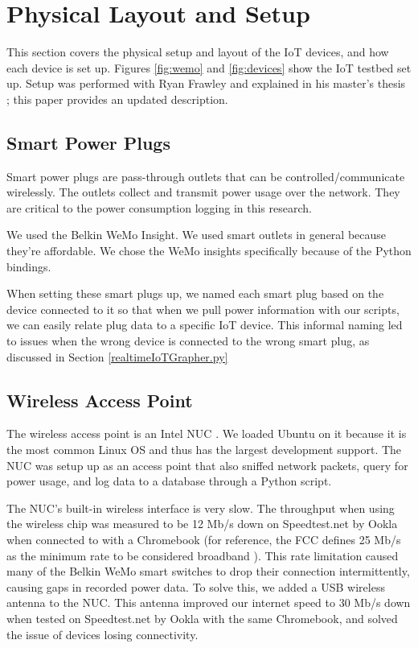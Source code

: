 \section{Physical Layout and Setup}
\label{Physical Layout and Setup}

This section covers the physical setup and layout of the IoT devices, and how each device is set up. Figures \ref{fig:wemo} and \ref{fig:devices} show the IoT testbed set up. Setup was performed with Ryan Frawley and explained in his master's thesis \cite{frawley_2018}; this paper provides an updated description.

\subsection{Smart Power Plugs}
Smart power plugs are pass-through outlets that can be controlled/communicate wirelessly. The outlets collect and transmit power usage over the network. They are critical to the power consumption logging in this research.

We used the Belkin WeMo Insight. We used smart outlets in general because they're affordable. We chose the WeMo insights specifically because of the Python bindings.

When setting these smart plugs up, we named each smart plug based on the device connected to it so that when we pull power information with our scripts, we can easily relate plug data to a specific IoT device. This informal naming led to issues when the wrong device is connected to the wrong smart plug, as discussed in Section \ref{realtimeIoTGrapher.py}

\subsection{Wireless Access Point}
\label{Wireless Access Point}
The wireless access point is an Intel NUC \cite{nuc}. We loaded Ubuntu\cite{ubuntu} on it because it is the most common Linux OS \cite{linux} and thus has the largest development support. The NUC was setup up as an access point that also sniffed network packets, query for power usage, and log data to a database through a Python script.

The NUC's built-in wireless interface is very slow. The throughput when using the wireless chip was measured to be 12 Mb/s down on Speedtest.net by Ookla \cite{speedtest} when connected to with a Chromebook \cite{chromebook} (for reference, the FCC defines 25 Mb/s as the minimum rate to be considered broadband \cite{fcc_2018}). This rate limitation caused many of the Belkin WeMo smart switches \cite{wemo} to drop their connection intermittently, causing gaps in recorded power data. To solve this, we added a USB wireless antenna to the NUC. This antenna improved our internet speed to 30 Mb/s down when tested on Speedtest.net by Ookla with the same Chromebook, and solved the issue of devices losing connectivity.


